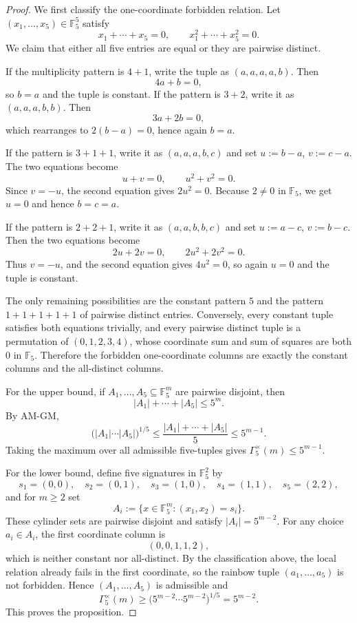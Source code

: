 \documentclass[11pt]{article}
\theoremstyle{definition}
\newcommand{\1}{\mathbf{1}}
\begin{document}
\begin{proof}
We first classify the one-coordinate forbidden relation. Let $(x_1,\dots,x_5)\in \mathbb F_5^5$ satisfy
\[
x_1+\cdots+x_5=0,
\qquad
x_1^2+\cdots+x_5^2=0.
\]
We claim that either all five entries are equal or they are pairwise distinct.

If the multiplicity pattern is $4+1$, write the tuple as $(a,a,a,a,b)$. Then
\[
4a+b=0,
\]
so $b=a$ and the tuple is constant. If the pattern is $3+2$, write it as $(a,a,a,b,b)$. Then
\[
3a+2b=0,
\]
which rearranges to $2(b-a)=0$, hence again $b=a$.

If the pattern is $3+1+1$, write it as $(a,a,a,b,c)$ and set $u:=b-a$, $v:=c-a$. The two equations become
\[
u+v=0,
\qquad
u^2+v^2=0.
\]
Since $v=-u$, the second equation gives $2u^2=0$. Because $2\neq 0$ in $\mathbb F_5$, we get $u=0$ and hence $b=c=a$.

If the pattern is $2+2+1$, write it as $(a,a,b,b,c)$ and set $u:=a-c$, $v:=b-c$. Then the two equations become
\[
2u+2v=0,
\qquad
2u^2+2v^2=0.
\]
Thus $v=-u$, and the second equation gives $4u^2=0$, so again $u=0$ and the tuple is constant.

The only remaining possibilities are the constant pattern $5$ and the pattern $1+1+1+1+1$ of pairwise distinct entries. Conversely, every constant tuple satisfies both equations trivially, and every pairwise distinct tuple is a permutation of $(0,1,2,3,4)$, whose coordinate sum and sum of squares are both $0$ in $\mathbb F_5$. Therefore the forbidden one-coordinate columns are exactly the constant columns and the all-distinct columns.

For the upper bound, if $A_1,\dots,A_5\subseteq \mathbb F_5^m$ are pairwise disjoint, then
\[
|A_1|+\cdots+|A_5|\le 5^m.
\]
By AM-GM,
\[
\bigl(|A_1|\cdots |A_5|\bigr)^{1/5}
\le
\frac{|A_1|+\cdots+|A_5|}{5}
\le
5^{m-1}.
\]
Taking the maximum over all admissible five-tuples gives $\Gamma_{5}^{\times}(m)\le 5^{m-1}$.

For the lower bound, define five signatures in $\mathbb F_5^2$ by
\[
s_1=(0,0),\quad s_2=(0,1),\quad s_3=(1,0),\quad s_4=(1,1),\quad s_5=(2,2),
\]
and for $m\ge 2$ set
\[
A_i:=\{x\in \mathbb F_5^m:(x_1,x_2)=s_i\}.
\]
These cylinder sets are pairwise disjoint and satisfy $|A_i|=5^{m-2}$. For any choice $a_i\in A_i$, the first coordinate column is
\[
(0,0,1,1,2),
\]
which is neither constant nor all-distinct. By the classification above, the local relation already fails in the first coordinate, so the rainbow tuple $(a_1,\dots,a_5)$ is not forbidden. Hence $(A_1,\dots,A_5)$ is admissible and
\[
\Gamma_{5}^{\times}(m)\ge \bigl(5^{m-2}\cdots 5^{m-2}\bigr)^{1/5}=5^{m-2}.
\]
This proves the proposition.
\end{proof}
\end{document}

